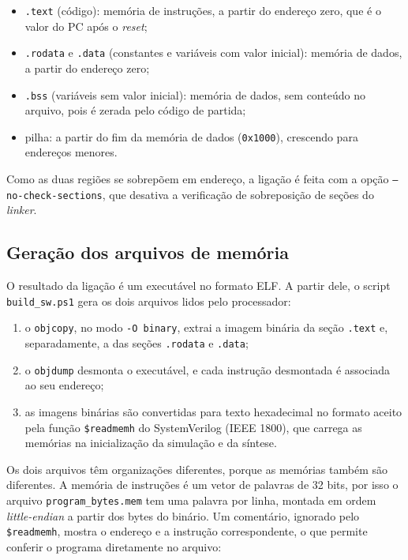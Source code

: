 \begin{itemize}
  \item \texttt{.text} (código): memória de instruções, a partir do endereço
    zero, que é o valor do PC após o \textit{reset};
  \item \texttt{.rodata} e \texttt{.data} (constantes e variáveis com valor
    inicial): memória de dados, a partir do endereço zero;
  \item \texttt{.bss} (variáveis sem valor inicial): memória de dados, sem
    conteúdo no arquivo, pois é zerada pelo código de partida;
  \item pilha: a partir do fim da memória de dados (\texttt{0x1000}),
    crescendo para endereços menores.
\end{itemize}

Como as duas regiões se sobrepõem em endereço, a ligação é feita com a opção
\texttt{--no-check-sections}, que desativa a verificação de sobreposição de
seções do \textit{linker}.

\subsection{Geração dos arquivos de memória}

O resultado da ligação é um executável no formato ELF. A partir dele, o
script \texttt{build\_sw.ps1} gera os dois arquivos lidos pelo processador:

\begin{enumerate}
  \item o \texttt{objcopy}, no modo \texttt{-O binary}, extrai a imagem
    binária da seção \texttt{.text} e, separadamente, a das seções
    \texttt{.rodata} e \texttt{.data};
  \item o \texttt{objdump} desmonta o executável, e cada instrução
    desmontada é associada ao seu endereço;
  \item as imagens binárias são convertidas para texto hexadecimal no
    formato aceito pela função \texttt{\$readmemh} do SystemVerilog (IEEE
    1800), que carrega as memórias na inicialização da simulação e da
    síntese.
\end{enumerate}

Os dois arquivos têm organizações diferentes, porque as memórias também são
diferentes. A memória de instruções é um vetor de palavras de 32 bits, por
isso o arquivo \texttt{program\_bytes.mem} tem uma palavra por linha,
montada em ordem \textit{little-endian} a partir dos bytes do binário. Um
comentário, ignorado pelo \texttt{\$readmemh}, mostra o endereço e a
instrução correspondente, o que permite conferir o programa diretamente no
arquivo:


